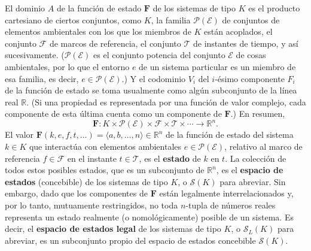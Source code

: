 {El dominio $A$ de la función de estado $\mathbf{F}$ de los sistemas de tipo $K$ es el producto cartesiano de ciertos conjuntos, como $K$, la familia $\mathcal{P}(\mathcal{E})$ de conjuntos de elementos ambientales con los que los miembros de $K$ están acoplados, el conjunto $\mathcal{F}$ de marcos de referencia, el conjunto $\mathcal{T}$ de instantes de tiempo, y así sucesivamente. ($\mathcal{P}(\mathcal{E})$ es el conjunto potencia del conjunto $\mathcal{E}$ de cosas ambientales, por lo que el entorno $e$ de un sistema particular es un miembro de esa familia, es decir, $e \in \mathcal{P}(\mathcal{E})$.) Y el codominio $V_i$ del $i$-ésimo componente $F_i$ de la función de estado se toma usualmente como algún subconjunto de la línea real $\mathbb{R}$. (Si una propiedad es representada por una función de valor complejo, cada componente de esta última cuenta como un componente de $\mathbf{F}$.) En resumen,
$$ \mathbf{F}: K \times \mathcal{P}(\mathcal{E}) \times \mathcal{F} \times \mathcal{T} \times \cdots \longrightarrow \mathbb{R}^n. $$
El valor $\mathbf{F}(k, e, f, t, \ldots) = \langle a, b, \ldots, n \rangle \in \mathbb{R}^n$ de la función de estado del sistema $k \in K$ que interactúa con elementos ambientales $e \in \mathcal{P}(\mathcal{E})$, relativo al marco de referencia $f \in \mathcal{F}$ en el instante $t \in \mathcal{T}$, es el \textbf{estado} de $k$ en $t$. La colección de todos estos posibles estados, que es un subconjunto de $\mathbb{R}^n$, es el \textbf{espacio de estados} (concebible) de los sistemas de tipo $K$, o $\mathcal{S}(K)$ para abreviar. Sin embargo, dado que los componentes de $\mathbf{F}$ están legalmente interrelacionados y, por lo tanto, mutuamente restringidos, no toda $n$-tupla de números reales representa un estado realmente (o nomológicamente) posible de un sistema. Es decir, el \textbf{espacio de estados legal} de los sistemas de tipo $K$, o $\mathcal{S}_L(K)$ para abreviar, es un subconjunto propio del espacio de estados concebible $\mathcal{S}(K)$.
}